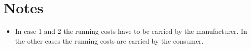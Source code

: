 \documentclass[journal]{IEEEtran}
\begin{document}









\section{Notes}
\begin{itemize}
\item In case 1 and 2 the running costs have to be carried by the manufacturer. In the other cases the running costs are carried by the consumer.
\end{itemize}
\end{document}
